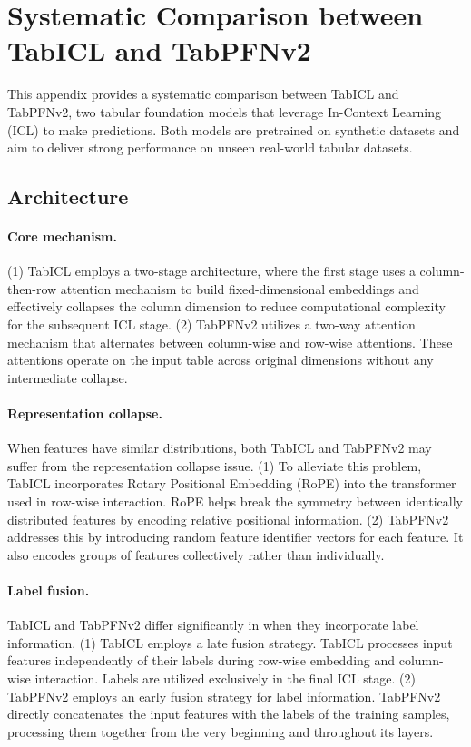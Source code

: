\documentclass{article}
\theoremstyle{plain}
\theoremstyle{definition}
\theoremstyle{remark}
\begin{document}
\newpage

\section{Systematic Comparison between TabICL and TabPFNv2} \label{sec:appendix:method_comparison}

This appendix provides a systematic comparison between TabICL and TabPFNv2, two tabular foundation models that leverage In-Context Learning (ICL) to make predictions. Both models are pretrained on synthetic datasets and aim to deliver strong performance on unseen real-world tabular datasets.

\subsection{Architecture}

\paragraph{Core mechanism.} (1) TabICL employs a two-stage architecture, where the first stage uses a column-then-row attention mechanism to build fixed-dimensional embeddings and effectively collapses the column dimension to reduce computational complexity for the subsequent ICL stage. (2) TabPFNv2 utilizes a two-way attention mechanism that alternates between column-wise and row-wise attentions. These attentions operate on the input table across original dimensions without any intermediate collapse.

\paragraph{Representation collapse.} When features have similar distributions, both TabICL and TabPFNv2 may suffer from the representation collapse issue. (1) To alleviate this problem, TabICL incorporates Rotary Positional Embedding (RoPE) into the transformer used in row-wise interaction. RoPE helps break the symmetry between identically distributed features by encoding relative positional information. (2) TabPFNv2 addresses this by introducing random feature identifier vectors for each feature. It also encodes groups of features collectively rather than individually.

\paragraph{Label fusion.} TabICL and TabPFNv2 differ significantly in when they incorporate label information. (1) TabICL employs a late fusion strategy. TabICL processes input features independently of their labels during row-wise embedding and column-wise interaction. Labels are utilized exclusively in the final ICL stage. (2) TabPFNv2 employs an early fusion strategy for label information. TabPFNv2 directly concatenates the input features with the labels of the training samples, processing them together from the very beginning and throughout its layers.
\end{document}
